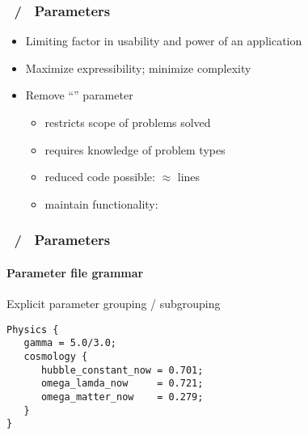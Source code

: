\begin{frame}[fragile] 
\frametitle{\enzop\ / \cello\ Parameters}
\begin{itemize}
\item Limiting factor in usability and power of an application
\item Maximize expressibility; minimize complexity
\item Remove ``'' parameter
\begin{itemize}
\item   restricts scope of problems solved
\item   requires knowledge of problem types
\item reduced code possible:  $\approx$ lines 
\item maintain functionality: 
\end{itemize}
\end{itemize}
\end{frame}

\begin{frame}[fragile] 
\frametitle{\enzop\ / \cello\ Parameters}
\framesubtitle{Parameter file grammar}
Explicit parameter grouping / subgrouping
  \begin{block}{}\footnotesize{}
      \verb+Physics {+ \\
      \verb+   gamma = 5.0/3.0;+ \\
      \verb+   cosmology {+ \\
      \verb+      hubble_constant_now = 0.701;+ \\
      \verb+      omega_lamda_now     = 0.721;+ \\
      \verb+      omega_matter_now    = 0.279;+ \\
      \verb+   }+ \\
      \verb+}+
   \end{block}
\end{frame}

